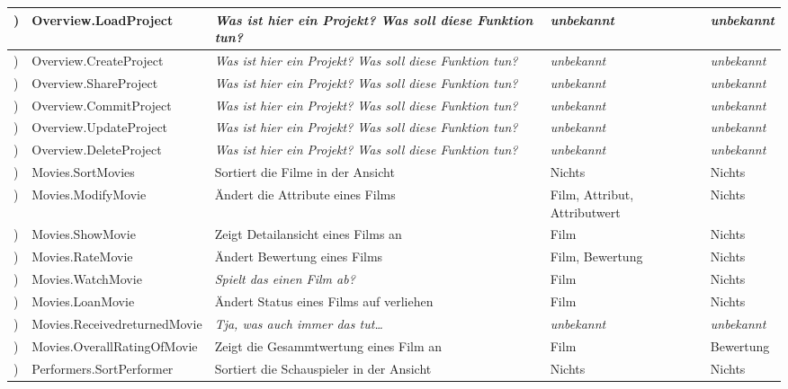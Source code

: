 \documentclass[ngerman]{scrartcl}
\begin{document}
\begin{tiny}
\begin{longtable}{@{\stepcounter{rowcount}} |l|l||l|l|l|  }
			\hline
			\therowcount) & Overview.LoadProject     		& \emph{Was ist hier ein Projekt? Was soll diese Funktion tun?} & \emph{unbekannt} & \emph{unbekannt}\\
			\hline
			\therowcount) & Overview.CreateProject   		& \emph{Was ist hier ein Projekt? Was soll diese Funktion tun?} & \emph{unbekannt} & \emph{unbekannt}\\
			\hline
			\therowcount) & Overview.ShareProject    		& \emph{Was ist hier ein Projekt? Was soll diese Funktion tun?} & \emph{unbekannt} & \emph{unbekannt}\\
			\hline
			\therowcount) & Overview.CommitProject   		& \emph{Was ist hier ein Projekt? Was soll diese Funktion tun?} & \emph{unbekannt} & \emph{unbekannt}\\
			\hline
			\therowcount) & Overview.UpdateProject   		& \emph{Was ist hier ein Projekt? Was soll diese Funktion tun?} & \emph{unbekannt} & \emph{unbekannt}\\
			\hline
			\therowcount) & Overview.DeleteProject   		& \emph{Was ist hier ein Projekt? Was soll diese Funktion tun?} & \emph{unbekannt} & \emph{unbekannt}\\
			\hline
			\hline
			\therowcount) & Movies.SortMovies        		& Sortiert die Filme in der Ansicht & Nichts & Nichts\\
			\hline
			\therowcount) & Movies.ModifyMovie       		& Ändert die Attribute eines Films & Film, Attribut, Attributwert & Nichts\\
			\hline
			\therowcount) & Movies.ShowMovie         		& Zeigt Detailansicht eines Films an & Film & Nichts\\
			\hline
			\therowcount) & Movies.RateMovie         		& Ändert Bewertung eines Films & Film, Bewertung & Nichts\\
			\hline
			\therowcount) & Movies.WatchMovie        		& \emph{Spielt das einen Film ab?} & Film & Nichts\\
			\hline
			\therowcount) & Movies.LoanMovie         		& Ändert Status eines Films auf verliehen & Film & Nichts\\
			\hline
			\therowcount) & Movies.ReceivedreturnedMovie	& \emph{Tja, was auch immer das tut\ldots} & \emph{unbekannt} & \emph{unbekannt}\\
			\hline
			\therowcount) & Movies.OverallRatingOfMovie		& Zeigt die Gesammtwertung eines Film an & Film & Bewertung\\
			\hline
			\hline
			\therowcount) & Performers.SortPerformer 		& Sortiert die Schauspieler in der Ansicht & Nichts & Nichts\\

\end{longtable}
\end{tiny}
\end{document}
